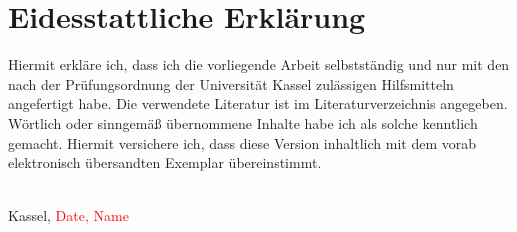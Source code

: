 \section*{Eidesstattliche Erklärung}

Hiermit erkläre ich, dass ich die vorliegende Arbeit selbstständig und nur mit den nach der Prüfungsordnung der Universität Kassel zulässigen Hilfsmitteln angefertigt habe.
Die verwendete Literatur ist im Literaturverzeichnis angegeben.
Wörtlich oder sinngemäß übernommene Inhalte habe ich als solche kenntlich gemacht.
Hiermit versichere ich, dass diese Version inhaltlich mit dem vorab elektronisch übersandten Exemplar übereinstimmt.

\vspace{1cm}



\begin{flushright}
  \underline{\hspace{7cm}} \\
  Kassel, \textcolor{red}{Date, Name}
\end{flushright}